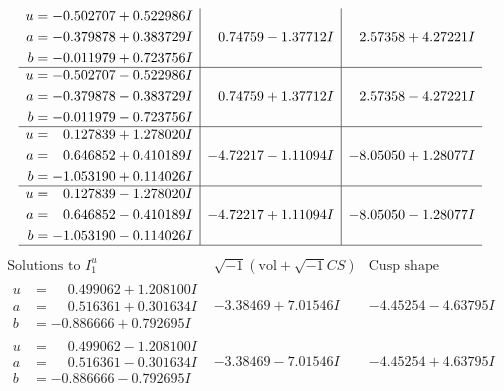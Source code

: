 \documentclass[1p]{elsarticle_modified}
\theoremstyle{definition}
\newcommand{\I}{\sqrt{-1}}
\begin{document}
$$\begin{array}{c|c|c}
\begin{aligned}
u &= -0.502707 + 0.522986 I \\
a &= -0.379878 + 0.383729 I \\
b &= -0.011979 + 0.723756 I\end{aligned}
 & \phantom{-}0.74759 - 1.37712 I & \phantom{-}2.57358 + 4.27221 I \\ \hline\begin{aligned}
u &= -0.502707 - 0.522986 I \\
a &= -0.379878 - 0.383729 I \\
b &= -0.011979 - 0.723756 I\end{aligned}
 & \phantom{-}0.74759 + 1.37712 I & \phantom{-}2.57358 - 4.27221 I \\ \hline\begin{aligned}
u &= \phantom{-}0.127839 + 1.278020 I \\
a &= \phantom{-}0.646852 + 0.410189 I \\
b &= -1.053190 + 0.114026 I\end{aligned}
 & -4.72217 - 1.11094 I & -8.05050 + 1.28077 I \\ \hline\begin{aligned}
u &= \phantom{-}0.127839 - 1.278020 I \\
a &= \phantom{-}0.646852 - 0.410189 I \\
b &= -1.053190 - 0.114026 I\end{aligned}
 & -4.72217 + 1.11094 I & -8.05050 - 1.28077 I\\
 \hline 
 \end{array}$$\newpage$$\begin{array}{c|c|c}  
\text{Solutions to }I^u_{1}& \I (\text{vol} + \sqrt{-1}CS) & \text{Cusp shape}\\
 \hline 
\begin{aligned}
u &= \phantom{-}0.499062 + 1.208100 I \\
a &= \phantom{-}0.516361 + 0.301634 I \\
b &= -0.886666 + 0.792695 I\end{aligned}
 & -3.38469 + 7.01546 I & -4.45254 - 4.63795 I \\ \hline\begin{aligned}
u &= \phantom{-}0.499062 - 1.208100 I \\
a &= \phantom{-}0.516361 - 0.301634 I \\
b &= -0.886666 - 0.792695 I\end{aligned}
 & -3.38469 - 7.01546 I & -4.45254 + 4.63795 I \\ \hline\begin{aligned}

\end{aligned}
\end{array}$$
\end{document}
